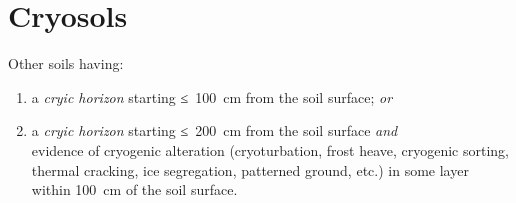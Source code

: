 \documentclass[
  letterpaper,
  DIV=11,
  numbers=noendperiod]{scrreprt}
\begin{document}

\hypertarget{key-cryosols}{%
\chapter{Cryosols}\label{key-cryosols}}

Other soils having:

\begin{enumerate}
\def\labelenumi{\arabic{enumi}.}
\item
  a \emph{cryic horizon} starting ≤~100~cm from the soil surface;
  \emph{or}
\item
  a \emph{cryic horizon} starting ≤~200~cm from the soil surface
  \emph{and}\\
  evidence of cryogenic alteration (cryoturbation, frost heave,
  cryogenic sorting, thermal cracking, ice segregation, patterned
  ground, etc.) in some layer within 100~cm of the soil surface.
\end{enumerate}
\end{document}
